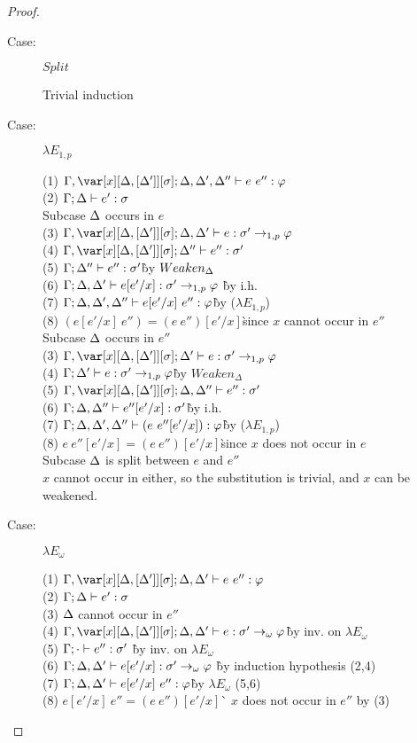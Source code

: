 \begin{proof}
\begin{description}
\item[Case:] $Split$
\begin{tabbing}
    Trivial induction
\end{tabbing}

\item[Case:] $\lambda E_{1,p}$
\begin{tabbing}
    (1) $\G, \xD; \D,\D',\D'' \vdash e~e'' : \varphi$\\
    (2) $\Gamma; \Delta \vdash e' : \sigma$\\
    Subcase $\Delta$ occurs in $e$\\
    (3) $\G, \xD; \D,\D' \vdash e : \s' \to_{1,p} \vp$\\
    (4) $\G, \xD; \D'' \vdash e'' : \s'$\\
    (5) $\Gamma; \Delta'' \vdash e'' : \sigma'$\` by $Weaken_\Delta$\\
    (6) $\Gamma; \Delta,\Delta' \vdash e[e'/x] : \sigma' \to_{1,p} \varphi$ \` by i.h.\\
    (7) $\Gamma;\Delta, \Delta', \Delta'' \vdash e[e'/x]~e'' : \varphi$\` by ($\lambda E_{1,p}$)\\
    (8) $(e[e'/x]~e'')=(e~e'')[e'/x]$\` since $x$ cannot occur in $e''$\\
    Subcase $\Delta$ occurs in $e''$\\
    (3) $\G, \xD; \D' \vdash e : \s' \to_{1,p} \vp$\\
    (4) $\Gamma; \Delta' \vdash e : \sigma' \to_{1,p} \varphi$\` by $Weaken_\Delta$\\
    (5) $\G,\xD; \D, \D'' \vdash e'' : \s'$\\
    (6) $\Gamma; \Delta, \Delta'' \vdash e''[e'/x] : \sigma'$\` by i.h.\\
    (7) $\Gamma; \Delta,\Delta',\Delta'' \vdash (e~e''[e'/x]) : \varphi$\` by ($\lambda E_{1,p}$)\\
    (8) $e~e''[e'/x] = (e~e'')[e'/x]$\`since $x$ does not occur in $e$\\
    Subcase $\Delta$ is split between $e$ and $e''$\\
    $x$ cannot occur in either, so the substitution is trivial, and $x$ can be weakened.

\end{tabbing}

\item[Case:] $\lambda E_\omega$
\begin{tabbing}
    (1) $\G, \xD; \D, \D' \vdash e~e'' : \vp$\\
    (2) $\Gamma; \Delta \vdash e' : \sigma$\\
    (3) $\Delta$ cannot occur in $e''$\\
    (4) $\G, \xD; \D, \D' \vdash e : \s' \to_\omega \vp$\` by inv. on $\lambda E_\omega$\\
    (5) $\Gamma; \cdot \vdash e'' : \sigma'$ \` by inv. on $\lambda E_\omega$\\
    (6) $\Gamma; \Delta, \Delta' \vdash e[e'/x] : \sigma' \to_\omega \varphi$ \` by induction hypothesis (2,4)\\
    (7) $\Gamma; \Delta, \Delta' \vdash e[e'/x]~e'' : \varphi$\` by $\lambda E_\omega$ (5,6)\\
    (8) $e[e'/x]~e'' = (e~e'')[e'/x]$\` $x$ does not occur in $e''$ by (3)\\
\end{tabbing}


\end{description}
\end{proof}
